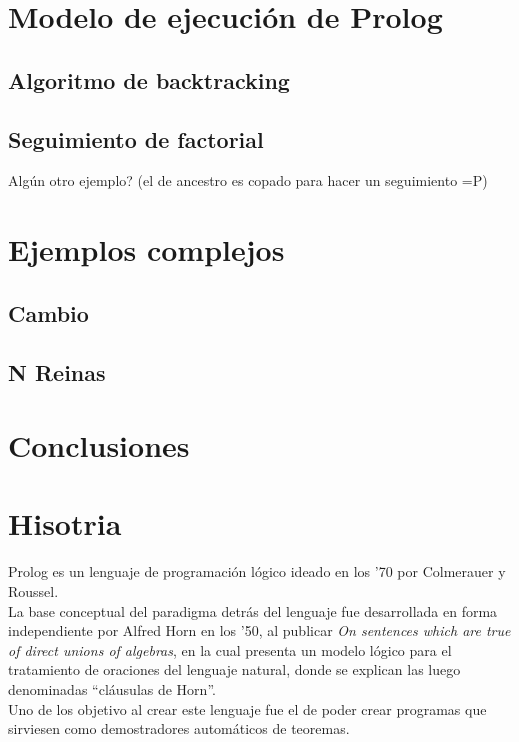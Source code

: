 \documentclass[12pt,titlepage]{article}
\begin{document}
\section{Modelo de ejecución de Prolog}
\subsection{Algoritmo de backtracking}
\subsection{Seguimiento de factorial}
    Algún otro ejemplo? (el de ancestro es copado para hacer un seguimiento =P)

\section{Ejemplos complejos}
\subsection{Cambio}
\subsection{N Reinas}

\section{Conclusiones}



\section{Hisotria}
Prolog es un lenguaje de programación lógico ideado en los '70 por Colmerauer y Roussel. \\

La base conceptual del paradigma detrás del lenguaje fue desarrollada en forma independiente por Alfred Horn en los '50, al publicar \textit{On sentences which are true of direct unions of algebras}, en la cual presenta un modelo lógico para el tratamiento de oraciones del lenguaje natural, donde se explican las luego denominadas ``cláusulas de Horn''. \\

Uno de los objetivo al crear este lenguaje fue el de poder crear programas que sirviesen como demostradores automáticos de teoremas. \\
\end{document}
